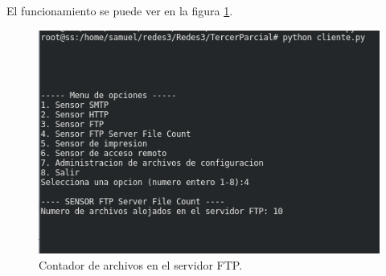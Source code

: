 El funcionamiento se puede ver en la figura \ref{image:ftpcounterfunc}.

\FloatBarrier
\begin{figure}[htbp!]
		\centering
			\includegraphics[width=.75 \textwidth]{images/ftpcounterfunc}
		\caption{Contador de archivos en el servidor FTP.}
		\label{image:ftpcounterfunc}
\end{figure}
\FloatBarrier